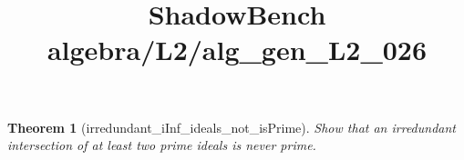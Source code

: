 \documentclass{article}
\title{ShadowBench algebra/L2/alg\_gen\_L2\_026}
\newtheorem{theorem}{Theorem}
\begin{document}
\maketitle

\begin{theorem}[irredundant_iInf_ideals_not_isPrime]
Show that an irredundant intersection of at least two prime ideals is never prime.
\end{theorem}
\end{document}
